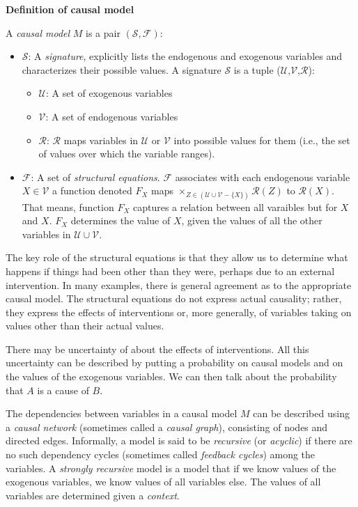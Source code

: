 \documentclass{article}
\begin{document}
\begin{mdframed}
\textbf{Definition of causal model}

A \textit{causal model} $M$ is a pair $(\mathcal{S}, \mathcal{F})$:
\begin{itemize}
	\item $\mathcal{S}$: A \textit{signature}, explicitly lists the endogenous and exogenous variables and characterizes their possible values. A signature $\mathcal{S}$ is a tuple ($\mathcal{U}$,$\mathcal{V}$,$\mathcal{R}$):
	\begin{itemize}
		\item $\mathcal{U}$: A set of exogenous variables
		\item $\mathcal{V}$: A set of endogenous variables
		\item $\mathcal{R}$: $\mathcal{R}$ maps variables in $\mathcal{U}$ or $\mathcal{V}$ into possible values for them (i.e., the set of values over which the variable ranges).
	\end{itemize}
	\item $\mathcal{F}$: A set of \textit{structural equations}. $\mathcal{F}$ associates with each endogenous variable $X \in \mathcal{V}$ a function denoted $F_{X}$ maps $\times_{Z \in(\mathcal{U} \cup \mathcal{V}-\{X\})} \mathcal{R}(Z)$ to $\mathcal{R}(X)$. That means, function $F_{X}$ captures a relation between all varaibles but for $X$ and $X$. $F_{X}$ determines the value of $X$, given the values of all the other variables in $\mathcal{U} \cup \mathcal{V}$. 
\end{itemize}
\end{mdframed}
	
The key role of the structural equations is that they allow us to determine what happens if things had been other than they were, perhaps due to an external intervention. In many examples, there is general agreement as to the appropriate causal model. The structural equations do not express actual causality; rather, they express the effects of interventions or, more generally, of variables taking on values other than their actual values. 

There may be  uncertainty of about the effects of interventions. All this uncertainty can be described by putting a probability on causal models and on the values of the exogenous variables. We can then talk about the probability that $A$ is a cause of $B$.

The dependencies between variables in a causal model $M$ can be described using a \textit{causal network} (sometimes called a \textit{causal graph}), consisting of nodes and directed edges. Informally, a model is said to be \textit{recursive} (or \textit{acyclic}) if there are no such dependency cycles (sometimes called \textit{feedback cycles}) among the variables. A \textit{strongly recursive} model is a model that if we know values of the exogenous variables, we know values of all variables else. The values of all variables are determined given a \textit{context}.
\end{document}
